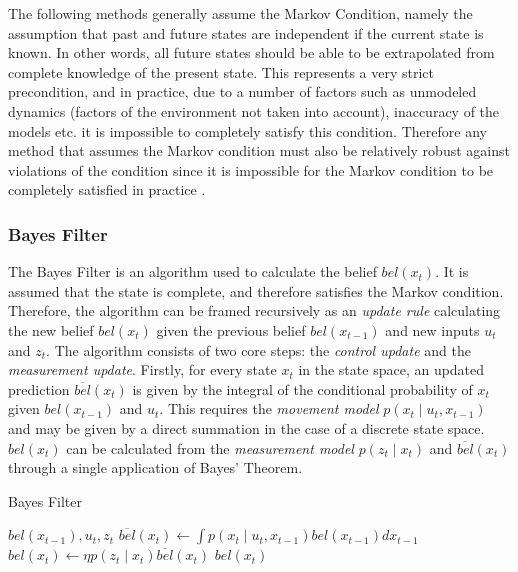 \documentclass[english]{article}
\begin{document}
The following methods generally assume the Markov Condition, namely the assumption that past and future states are independent if the current state is known. In other words, all future states should be able to be extrapolated from complete knowledge of the present state. This represents a very strict precondition, and in practice, due to a number of factors such as unmodeled dynamics (factors of the environment not taken into account), inaccuracy of the models etc. it is impossible to completely satisfy this condition. Therefore any method that assumes the Markov condition must also be relatively robust against violations of the condition since it is impossible for the Markov condition to be completely satisfied in practice \cite[pp 33]{probrob}.

\subsubsection{Bayes Filter}


The Bayes Filter is an algorithm used to calculate the belief $bel(x_t)$. It is assumed that the state is complete, and therefore satisfies the Markov condition. Therefore, the algorithm can be framed recursively as an \emph{update rule} calculating the new belief $bel({x_t})$ given the previous belief $bel(x_{t-1})$ and new inputs $u_t$ and $z_t$. The algorithm consists of two core steps: the \emph{control update} and the \emph{measurement update}. Firstly, for every state $x_t$ in the state space, an updated prediction $\overline{bel}(x_t)$ is given by the integral of the conditional probability of $x_t$ given $bel(x_{t-1})$ and $u_t$\cite{probrob}. This requires the \emph{movement model} $p(x_t \mid u_t,x_{t-1})$ and may be given by a direct summation in the case of a discrete state space. $bel(x_t)$ can be calculated from the \emph{measurement model} $p(z_t \mid x_t)$ and $\overline{bel}(x_t)$ through a single application of Bayes' Theorem.

\begin{algorithm}[H]
\caption{Bayes Filter}
\label{alg:bayes}
\begin{algorithmic}
	\REQUIRE $bel(x_{t-1}), u_t, z_t$
        \STATE $\overline{bel}(x_t) \leftarrow \int p(x_t \mid u_t, x_{t-1})bel(x_{t-1}) dx_{t-1}$
        \STATE $bel(x_t) \leftarrow \eta p(z_t \mid x_t) \overline{bel}(x_t)$
        \ENDFOR
        \RETURN $bel(x_t)$
\end{algorithmic}
\end{algorithm}
\end{document}
